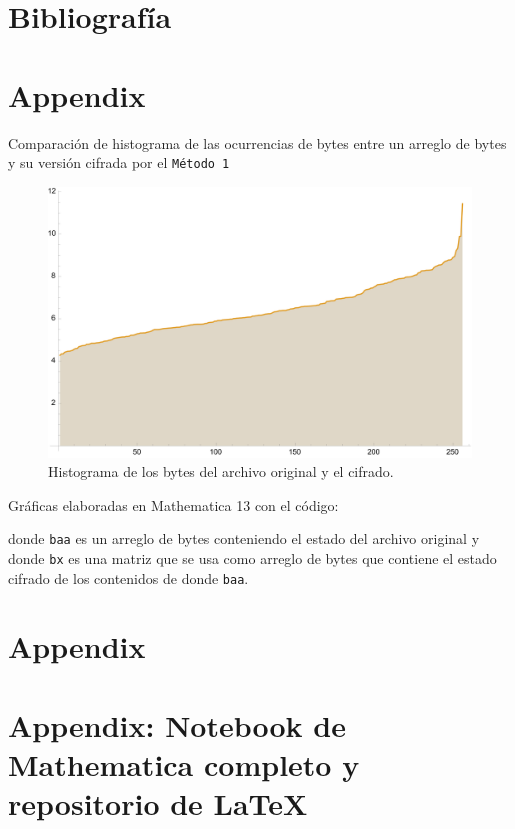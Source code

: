 \newpage
\section{Bibliografía}
\printbibliography[heading=none]

\newpage

\appendix

\section{Appendix}

Comparación de histograma de las ocurrencias de bytes entre un arreglo de bytes
y su versión cifrada por el \texttt{Método 1}

\begin{figure}[H]
    \centering
    \includegraphics[scale=0.7]{../img/historygram}
    \caption*{Histograma de los bytes del archivo
original y el cifrado.}\label{fig:d2}
\end{figure}

Gráficas elaboradas en Mathematica 13 con el código:

donde \texttt{baa} es un arreglo de bytes conteniendo el estado del archivo
original y donde \texttt{bx} es una matriz que se usa como arreglo de bytes que
contiene el estado cifrado de los contenidos de donde \texttt{baa}.

\newpage
\section{Appendix}


\newpage
\section{Appendix: Notebook de Mathematica completo y repositorio de LaTeX}

